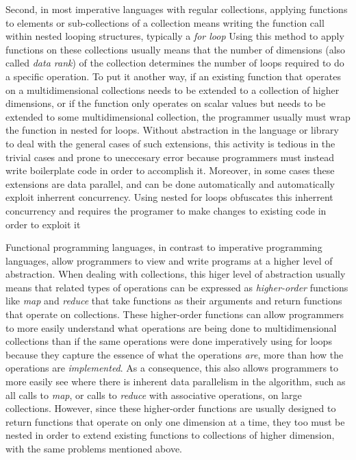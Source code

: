 Second, in most imperative languages with regular collections, 
applying functions to elements or sub-collections of a collection means 
writing the function call within nested looping structures, typically a \textit{for loop}
Using this method to apply functions on these collections usually means that 
the number of dimensions (also called \textit{data rank}) of the collection 
determines the number of loops required to do a specific operation.
To put it another way, if an existing function that operates on a multidimensional collections 
needs to be extended to a collection of higher dimensions, 
or if the function only operates on scalar values but needs to be extended to some multidimensional collection, 
the programmer usually must wrap the function in nested for loops.
Without abstraction in the language or library to deal with the general cases of such extensions, 
this activity is tedious in the trivial cases and prone to uneccesary error 
because programmers must instead write boilerplate code in order to accomplish it.
Moreover, in some cases these extensions are data parallel, 
and can be done automatically and automatically exploit inherrent concurrency.
Using nested for loops obfuscates this inherrent concurrency and 
requires the programer to make changes to existing code in order to exploit it

Functional programming languages, in contrast to imperative programming languages, allow programmers to view and write programs at a higher level of abstraction.
When dealing with collections, this higer level of abstraction usually means that related types of operations can be expressed as \textit{higher-order} functions 
like \textit{map} and \textit{reduce} that take functions as their arguments and return functions that operate on collections.
These higher-order functions can allow programmers to more easily understand what operations are being done to multidimensional collections 
than if the same operations were done imperatively using for loops 
because they capture the essence of what the operations \textit{are}, more than how the operations are \textit{implemented}.
As a consequence, this also allows programmers to more easily see where there is inherent data parallelism in the algorithm, such as all calls to \textit{map}, or calls to \textit{reduce} with associative operations, on large collections.
However, since these higher-order functions are usually designed to return functions that operate on only one dimension at a time, 
they too must be nested in order to extend existing functions to collections of higher dimension, with the same problems mentioned above.

